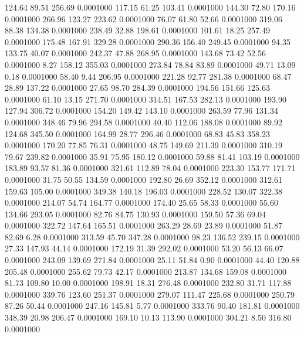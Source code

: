  124.64   89.51  256.69   0.0001000
 117.15   61.25  103.41   0.0001000
 144.30   72.80  170.16   0.0001000
 266.96  123.27  223.62   0.0001000
  76.07   61.80   52.66   0.0001000
 319.06   88.38  134.38   0.0001000
 238.49   32.88  198.61   0.0001000
 101.61   18.25  257.49   0.0001000
 175.48  167.91  329.28   0.0001000
 290.36  156.40  249.45   0.0001000
  94.35  133.75   40.07   0.0001000
 242.37   47.88  268.95   0.0001000
 143.68   73.42   52.56   0.0001000
   8.27  158.12  355.03   0.0001000
 273.84   78.84   83.89   0.0001000
  49.71   13.09    0.18   0.0001000
  58.40    9.44  206.95   0.0001000
 221.28   92.77  281.38   0.0001000
  68.47   28.89  137.22   0.0001000
  27.65   98.70  284.39   0.0001000
 194.56  151.66  125.63   0.0001000
  61.10   13.15  271.70   0.0001000
 314.51  167.53  282.13   0.0001000
 193.90  127.94  306.72   0.0001000
 154.20  149.42  143.10   0.0001000
 263.59   77.96  131.34   0.0001000
 348.46   79.96  294.58   0.0001000
  40.40  112.06  188.08   0.0001000
  89.92  124.68  345.50   0.0001000
 164.99   28.77  296.46   0.0001000
  68.83   45.83  358.23   0.0001000
 170.20   77.85   76.31   0.0001000
  48.75  149.69  211.39   0.0001000
 310.19   79.67  239.82   0.0001000
  35.91   75.95  180.12   0.0001000
  59.88   81.41  103.19   0.0001000
 183.89   93.57   81.36   0.0001000
 321.61  112.89   78.04   0.0001000
 223.30  153.77  171.71   0.0001000
  31.75   50.55  134.59   0.0001000
 192.80   26.69  352.12   0.0001000
 312.61  159.63  105.00   0.0001000
 349.38  140.18  196.03   0.0001000
 228.52  130.07  322.38   0.0001000
 214.07   54.74  164.77   0.0001000
 174.40   25.65   58.33   0.0001000
  55.60  134.66  293.05   0.0001000
  82.76   84.75  130.93   0.0001000
 159.50   57.36   69.04   0.0001000
 322.72  147.64  165.51   0.0001000
 263.29   28.69   23.89   0.0001000
  51.87   82.69    6.28   0.0001000
 313.59   45.70  347.28   0.0001000
  98.23  136.52  239.15   0.0001000
  27.33  147.93   44.14   0.0001000
 172.19   31.39  292.02   0.0001000
  53.20   56.13   66.07   0.0001000
 243.09  139.69  271.84   0.0001000
  25.11   51.84    0.90   0.0001000
  44.40  120.88  205.48   0.0001000
 255.62   79.73   42.17   0.0001000
 213.87  134.68  159.08   0.0001000
  81.73  109.80   10.00   0.0001000
 198.91   18.31  276.48   0.0001000
 232.80   31.71  117.88   0.0001000
 339.76  123.60  251.37   0.0001000
 279.07  111.47  225.68   0.0001000
 250.79   87.26   50.44   0.0001000
 247.16  145.81    5.77   0.0001000
 333.76   90.40  181.81   0.0001000
 348.39   20.98  206.47   0.0001000
 169.10   10.13  113.90   0.0001000
 304.21    8.50  316.80   0.0001000
